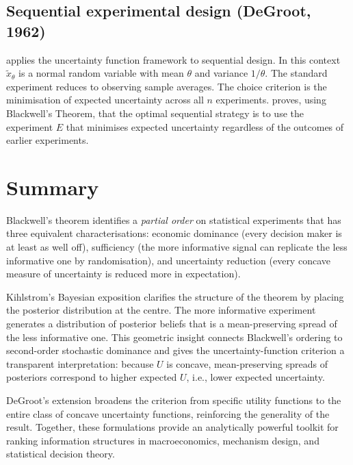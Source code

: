 \documentclass[12pt]{article}
\begin{document}
\subsection{Sequential experimental design (DeGroot, 1962)}

\citet{degroot1962} applies the uncertainty function framework to sequential
design.  In this context $\tilde{x}_\theta$ is a normal random variable with
mean $\theta$ and variance $1/\theta$.  The standard experiment reduces to
observing sample averages.  The choice criterion is the minimisation of
expected uncertainty across all $n$ experiments.  \citeauthor{degroot1962}
proves, using Blackwell's Theorem, that the optimal sequential strategy is to
use the experiment $E$ that minimises expected uncertainty regardless of the
outcomes of earlier experiments.

\section{Summary}

Blackwell's theorem identifies a \emph{partial order} on statistical
experiments that has three equivalent characterisations: economic dominance
(every decision maker is at least as well off), sufficiency (the more
informative signal can replicate the less informative one by randomisation),
and uncertainty reduction (every concave measure of uncertainty is reduced
more in expectation).

Kihlstrom's Bayesian exposition clarifies the structure of the theorem
by placing the posterior distribution at the centre.  The more informative
experiment generates a distribution of posterior beliefs that is a
mean-preserving spread of the less informative one.  This geometric insight
connects Blackwell's ordering to second-order stochastic dominance and gives
the uncertainty-function criterion a transparent interpretation: because $U$
is concave, mean-preserving spreads of posteriors correspond to higher expected
$U$, i.e., lower expected uncertainty.

DeGroot's extension broadens the criterion from specific utility functions to
the entire class of concave uncertainty functions, reinforcing the generality
of the result.  Together, these formulations provide an analytically powerful
toolkit for ranking information structures in macroeconomics, mechanism design,
and statistical decision theory.

\bigskip


\end{document}
